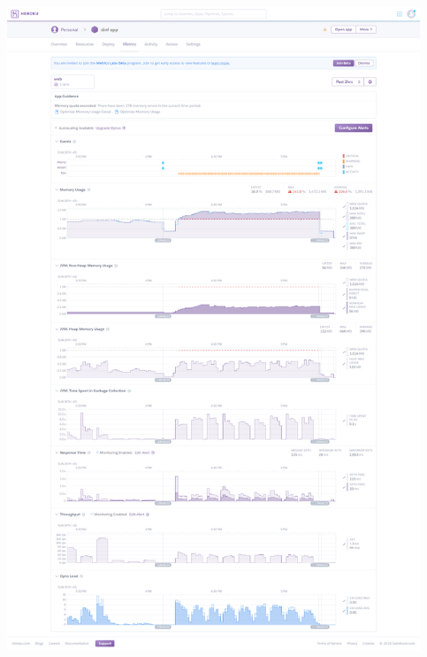 \documentclass{ffhsthesis}
\begin{document}
\includegraphics[width=350pt ]{anhang/screencapture-dashboard-heroku-apps-dinf-app-metrics-web-1517156607741.png}\newline
\end{document}
